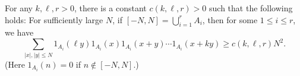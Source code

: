 \begin{proposition}\label{prop:counting-brauer}
For any $k, \ell, r>0$, there is a constant $c(k, \ell, r) > 0$ such that the following holds: For sufficiently large $N$, if $[-N, N] = \bigcup_{i=1}^r A_i$, then for some $1 \leq i \leq r$, we have
\[
\sum_{|x|, |y| \leq N} 1_{A_i}(\ell y) 1_{A_i}(x) 1_{A_i}(x+y) \cdots 1_{A_i}(x + ky) \geq c(k, \ell, r) N^2.
\]
(Here $1_{A_i}(n) = 0$ if $n \not \in [-N, N]$.)
\end{proposition}
